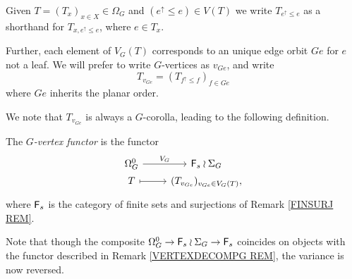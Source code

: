 \documentclass[a4paper,10pt]{article}%
\begin{document}
\begin{notation}\label{GVERT NOT}
Given $T=(T_x)_{x \in X} \in \Omega_G$
and $(e^{\uparrow} \leq e) \in V(T)$ 
we write $T_{e^{\uparrow}\leq e}$
as a shorthand for $T_{x,e^{\uparrow}\leq e}$, where $e \in T_x$.

Further, each element of $V_G(T)$ corresponds to an unique edge orbit $Ge$ for $e$ not a leaf.
We will prefer to write $G$-vertices as $v_{Ge}$, and write
\begin{equation}\label{TVGE DEF}
T_{v_{Ge}} = (T_{f^{\uparrow} \leq f})_{f \in Ge}
\end{equation}
where $Ge$ inherits the planar order.
\end{notation}


We note that $T_{v_{Ge}}$ is always a $G$-corolla, leading to the following definition.

\begin{definition}
The \textit{$G$-vertex functor} is the functor
\[
	\begin{tikzcd}[row sep=0]
	\Omega_{G}^0 \ar{r}{V_G} & \Fin_s \wr \Sigma_G \\
	T \ar[mapsto]{r} & (T_{v_{Ge}})_{v_{Ge} \in V_G(T)},
	\end{tikzcd}	
\]
where $\mathsf{F}_s$ is the category of finite sets and surjections of
Remark \ref{FINSURJ REM}.
\end{definition}

\begin{remark}
	Note that though the composite
	$\Omega_G^0 \to \mathsf{F}_s \wr \Sigma_G \to \mathsf{F}_s$
	coincides on objects with the functor described in Remark \ref{VERTEXDECOMPG REM},
	the variance is now reversed. 
\end{remark}
\end{document}
